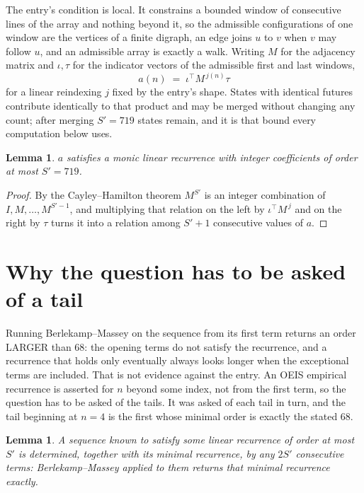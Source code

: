 \documentclass[11pt,a4paper]{article}
\theoremstyle{plain}
\newtheorem{lemma}[theorem]{Lemma}
\theoremstyle{definition}
\begin{document}
The entry's condition is local. It constrains a bounded window of consecutive lines of the
array and nothing beyond it, so the admissible configurations of one window are the vertices of
a finite digraph, an edge joins $u$ to $v$ when $v$ may follow $u$, and an admissible array is
exactly a walk. Writing $M$ for the adjacency matrix and $\iota,\tau$ for the indicator vectors
of the admissible first and last windows,
\[
a(n)\;=\;\iota^{\!\top}M^{\,j(n)}\tau
\]
for a linear reindexing $j$ fixed by the entry's shape. States with identical futures
contribute identically to that product and may be merged without changing any count; after
merging $S'=719$ states remain, and it is that bound every computation below uses.

\begin{lemma}\label{lem:cf}
$a$ satisfies a monic linear recurrence with integer coefficients of order at most $S'=719$.
\end{lemma}

\begin{proof}
By the Cayley--Hamilton theorem $M^{S'}$ is an integer combination of $I,M,\dots,M^{S'-1}$,
and multiplying that relation on the left by $\iota^{\!\top}M^{\,j}$ and on the right by
$\tau$ turns it into a relation among $S'+1$ consecutive values of $a$.
\end{proof}

\section{Why the question has to be asked of a tail}

Running Berlekamp--Massey on the sequence from its first term returns an order LARGER than $68$: the opening terms do not satisfy the recurrence, and a recurrence that holds only eventually always looks longer when the exceptional terms are included. That is not evidence against the entry. An OEIS empirical recurrence is asserted for $n$ beyond some index, not from the first term, so the question has to be asked of the tails. It was asked of each tail in turn, and the tail beginning at $n=4$ is the first whose minimal order is exactly the stated $68$.

\begin{lemma}\label{lem:bm}
A sequence known to satisfy some linear recurrence of order at most $S'$ is determined,
together with its minimal recurrence, by any $2S'$ consecutive terms: Berlekamp--Massey applied
to them returns that minimal recurrence exactly.
\end{lemma}
\end{document}

